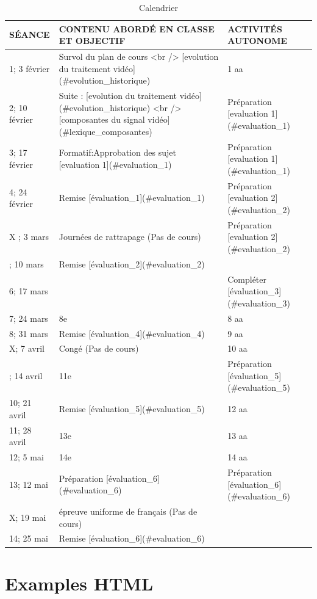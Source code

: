 \documentclass[
]{book}
\begin{document}
\begin{table}

\caption{\label{tab:calendrier}Calendrier}
\centering
\begin{tabular}[t]{lll}
\toprule
SÉANCE & CONTENU ABORDÉ EN CLASSE ET OBJECTIF & ACTIVITÉS AUTONOME\\
\midrule
1; 3 février & Survol du plan de cours <br /> [evolution du traitement vidéo](\#evolution\_historique) & 1 aa\\
2; 10 février & Suite : [evolution du traitement vidéo](\#evolution\_historique) <br /> [composantes du signal vidéo](\#lexique\_composantes) & Préparation [evaluation 1](\#evaluation\_1)\\
3; 17 février & Formatif:Approbation des sujet [evaluation 1](\#evaluation\_1) & Préparation [evaluation 1](\#evaluation\_1)\\
4; 24 février & Remise [évaluation\_1](\#evaluation\_1) & Préparation [evaluation 2](\#evaluation\_2)\\
X ; 3 mars & Journées de rattrapage (Pas de cours) & Préparation [evaluation 2](\#evaluation\_2)\\
\addlinespace
5; 10 mars & Remise [évaluation\_2](\#evaluation\_2) & \\
6; 17 mars &  & Compléter [évaluation\_3](\#evaluation\_3)\\
7; 24 mars & 8e & 8 aa\\
8; 31 mars & Remise [évaluation\_4](\#evaluation\_4) & 9 aa\\
X; 7 avril & Congé (Pas de cours) & 10 aa\\
\addlinespace
9; 14 avril & 11e & Préparation [évaluation\_5](\#evaluation\_5)\\
10; 21 avril & Remise [évaluation\_5](\#evaluation\_5) & 12 aa\\
11; 28 avril & 13e & 13 aa\\
12; 5 mai & 14e & 14 aa\\
13; 12 mai & Préparation [évaluation\_6](\#evaluation\_6) & Préparation [évaluation\_6](\#evaluation\_6)\\
\addlinespace
X; 19 mai & épreuve uniforme de français (Pas de cours) & \\
14; 25 mai & Remise [évaluation\_6](\#evaluation\_6) & \\
\bottomrule
\end{tabular}
\end{table}

\hypertarget{examples-html}{%
\chapter{Examples HTML}\label{examples-html}}

  
\end{document}
